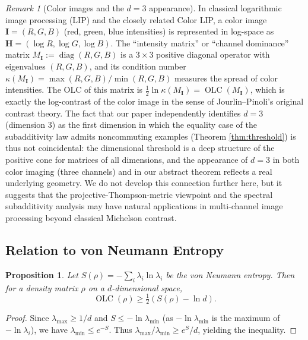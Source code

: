\documentclass{article}
\newtheorem{proposition}[theorem]{Proposition}
\theoremstyle{remark}
\newtheorem{remark}[theorem]{Remark}
\providecommand{\QLC}{\operatorname{OLC}}
\begin{document}
\begin{remark}[Color images and the $d=3$ appearance]
In classical logarithmic image processing (LIP) and the closely related Color LIP, a color image $\mathbf{I}=(R,G,B)$ (red, green, blue intensities) is represented in log-space as $\mathbf{H}=(\log R,\log G,\log B)$. The ``intensity matrix'' or ``channel dominance'' matrix $M_\mathbf{I}:=\operatorname{diag}(R,G,B)$ is a $3\times3$ positive diagonal operator with eigenvalues $(R,G,B)$, and its condition number $\kappa(M_\mathbf{I})=\max(R,G,B)/\min(R,G,B)$ measures the spread of color intensities. The OLC of this matrix is $\tfrac12\ln\kappa(M_\mathbf{I})=\QLC(M_\mathbf{I})$, which is exactly the log-contrast of the color image in the sense of Jourlin--Pinoli's original contrast theory. The fact that our paper independently identifies $d=3$ (dimension 3) as the first dimension in which the equality case of the subadditivity law admits noncommuting examples (Theorem \ref{thm:threshold}) is thus not coincidental: the dimensional threshold is a deep structure of the positive cone for matrices of all dimensions, and the appearance of $d=3$ in both color imaging (three channels) and in our abstract theorem reflects a real underlying geometry. We do not develop this connection further here, but it suggests that the projective-Thompson-metric viewpoint and the spectral subadditivity analysis may have natural applications in multi-channel image processing beyond classical Michelson contrast.
\end{remark}

\subsection{Relation to von Neumann Entropy}

\begin{proposition}\label{prop:entropy-bound}
Let $S(\rho)=-\sum_i\lambda_i\ln\lambda_i$ be the von Neumann entropy. Then for a density matrix $\rho$ on a $d$-dimensional space,
\[
\QLC(\rho) \ge \tfrac12(S(\rho)-\ln d). \tag{15}
\]
\end{proposition}
\begin{proof}
Since $\lambda_{\max}\ge1/d$ and $S\le-\ln\lambda_{\min}$ (as $-\ln\lambda_{\min}$ is the maximum of $-\ln\lambda_i$), we have $\lambda_{\min}\le e^{-S}$. Thus $\lambda_{\max}/\lambda_{\min}\ge e^S/d$, yielding the inequality.
\end{proof}
\end{document}
